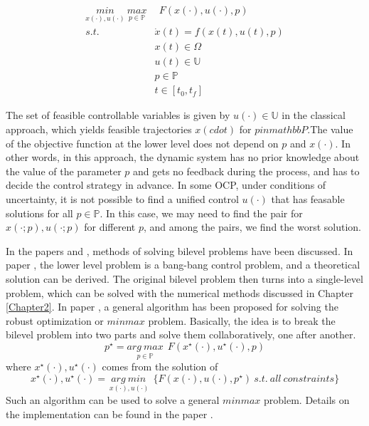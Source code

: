 \documentclass  [
  paper    = a4,
  BCOR     = 10mm,
  twoside,
  fontsize = 12pt,
  fleqn,
  toc      = bibnumbered,
  toc      = listofnumbered,
  numbers  = noendperiod,
  headings = normal,
  listof   = leveldown,
  version  = 3.03
]                                       {scrreprt}
\newcommand{\<}{\langle}
\renewcommand{\>}{\rangle}
\begin{document}
\begin{equation}
	\begin{aligned}
		\underset{x(\cdot), u(\cdot)}{min} \   \underset{p  \in   \mathbb{P} }{max} & \ \ F(x(\cdot), u(\cdot), p)\\ 
	s.t.\ \   &  \dot{x} (t) = f(x(t), u(t), p)\\ 
& x(t) \in \Omega \\
& u(t) \in \mathbb{U}  \\
& p  \in   \mathbb{P}  \\
& t \in [t_0, t_f]
	\end{aligned}
	\label{minmax}
\end{equation}

The set of feasible controllable variables is given by $u(\cdot) \in \mathbb{U}$ in the classical approach, which yields feasible trajectories $x(cdot)$ for $p in mathbbP$.The value of the objective function at the lower level does not depend on $p$ and $x(\cdot)$. In other words, in this approach, the dynamic system has no prior knowledge about the value of the parameter $p$ and gets no feedback during the process, and has to decide the control strategy in advance. In some OCP, under conditions of uncertainty, it is not possible to find a unified control $u(\cdot)$ that has feasable solutions for all $p \in  \mathbb{P}$. In this case, we may need to find the pair for $x(\cdot;p), u(\cdot;p)$ for different $p$, and among the pairs, we find the worst solution.


In the papers \cite{Mas14} and \cite{KM16}, methods of solving bilevel problems have been discussed. In paper \cite{KM16}, the lower level problem is a bang-bang control problem, and a theoretical solution can be derived. The original bilevel problem then turns into a single-level problem, which can be solved with the numerical methods discussed in Chapter \ref{Chapter2}. In paper \cite{Mas14}, a general algorithm has been proposed for solving the robust optimization or $minmax$ problem. Basically, the idea is to break the bilevel problem into two parts and solve them collaboratively, one after another.
\begin{equation}
	   p^\star = \underset{p \in  \mathbb{P} }{arg\ max}   \ \ F(x^\star(\cdot), u^\star(\cdot), p)
\end{equation}
where $x^\star(\cdot), u^\star(\cdot)$ comes from the solution of 
\begin{equation}
	x^\star(\cdot), u^\star(\cdot) = \underset{\ x(\cdot), u(\cdot)}{arg\ min}   \ \ \{F(x(\cdot), u(\cdot), p^\star) \ s.t. \  all \ constraints \}
\end{equation}
Such an algorithm can be used to solve a general $minmax$ problem. Details on the implementation can be found in the paper \cite{Mas14}.
\end{document}
